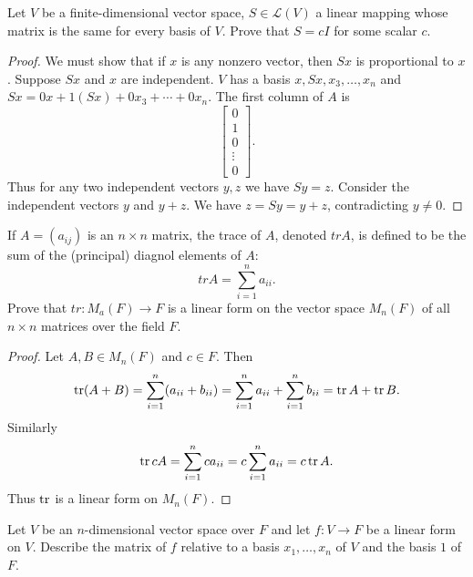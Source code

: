 \begin{tcolorbox}[title=Exercise 6, breakable]
    Let $V$ be a finite-dimensional vector space,
    $S \in \mathcal{L}(V)$ a linear mapping whose 
    matrix is the same for every basis of $V$.
    Prove that $S = c I$ for some scalar $c$.
\end{tcolorbox}

\begin{proof}
    We must show that if $x$ is any nonzero
    vector, then $Sx$ is proportional to $x$.
    Suppose $Sx$ and $x$ are independent.
    $V$ has a basis $x, Sx, x_3, \ldots, x_n$
    and $Sx = 0x + 1(Sx) + 0x_3 + \cdots + 0x_n$.
    The first column of $A$ is
    \[
    \begin{bmatrix}
        0 \\ 1 \\ 0 \\ \vdots \\ 0
    \end{bmatrix}
    .\]
    Thus for any two independent vectors $y, z$ we have $Sy = z$.
    Consider the independent vectors $y$ and $y + z$.
    We have $z = Sy = y + z$, contradicting $y \ne 0$.
\end{proof}

\begin{tcolorbox}[title=Exercise 7, breakable]
    If $A = (a_{ij})$ is an $n \times n$
    matrix, the trace of $A$, denoted $tr A$,
    is defined to be the sum of the (principal)
    diagnol elements of $A$:
    \[tr A = \sum_{i = 1}^n a_{ii}.\]
    Prove that $tr : M_a (F) \longrightarrow F$
    is a linear form on the vector space $M_n (F)$
    of all $n \times n$ matrices over the field $F$.
\end{tcolorbox}

\begin{proof}
    Let $A, B \in M_n(F)$ and $c \in F$.
    Then 
    \[\operatorname{tr}(A + B) = \sum_{i = 1}^{n} (a_{ii} + b_{ii}) = \sum_{i = 1}^{n} a_{ii} + \sum_{i = 1}^{n} b_{ii} = \operatorname{tr} A + \operatorname{tr} B.\]
    Similarly 
    \[\operatorname{tr} cA = \sum_{i = 1}^{n} c a_{ii} = c \sum_{i = 1}^{n} a_{ii} = c \operatorname{tr} A.\]
    Thus $\operatorname{tr}$ is a linear form on $M_n(F)$.
\end{proof}

\begin{tcolorbox}[title=Exercise 8, breakable]
    Let $V$ be an $n$-dimensional vector space over $F$ and let
    $f : V \to F$ be a linear form on $V$. Describe the matrix of
    $f$ relative to a basis $x_1, \ldots, x_n$ of $V$ and the
    basis $1$ of $F$.
\end{tcolorbox}

